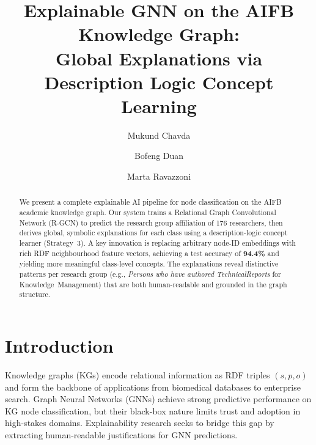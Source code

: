 \documentclass[runningheads]{llncs}
\begin{document}
%
\title{Explainable GNN on the AIFB Knowledge Graph:\\
Global Explanations via Description Logic Concept Learning}
%
%
\author{Mukund Chavda \and
Bofeng Duan \and
Marta Ravazzoni}
%
%
%
\maketitle              %
%
\begin{abstract}
We present a complete explainable AI pipeline for node classification on the AIFB academic
knowledge graph.
Our system trains a Relational Graph Convolutional Network (R-GCN) to predict the research group
affiliation of 176 researchers, then derives global, symbolic explanations for each class using a
description-logic concept learner (Strategy~3).
A key innovation is replacing arbitrary node-ID embeddings with rich RDF neighbourhood feature
vectors, achieving a test accuracy of \textbf{94.4\%} and yielding more meaningful class-level
concepts.
The explanations reveal distinctive patterns per research group
(e.g., \emph{Persons who have authored TechnicalReports} for Knowledge~Management)
that are both human-readable and grounded in the graph structure.

\end{abstract}
%
%
%
\section{Introduction}

Knowledge graphs (KGs) encode relational information as RDF triples $(s, p, o)$ and form the
backbone of applications from biomedical databases to enterprise search.
Graph Neural Networks (GNNs) achieve strong predictive performance on KG node classification,
but their black-box nature limits trust and adoption in high-stakes domains.
Explainability research seeks to bridge this gap by extracting human-readable justifications
for GNN predictions.
\end{document}
